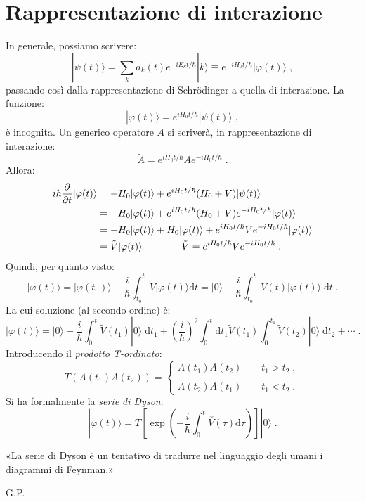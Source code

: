 \documentclass[12pt,a4paper]{report}
\theoremstyle{definition}
\numberwithin{equation}{section}
\newcommand{\diff}[1][]{\mathrm{d}#1}
\newcommand{\ket}{\rangle}
\newcommand{\Sch}{Schrödinger}
\begin{document}
\section{Rappresentazione di interazione}
In generale, possiamo scrivere:
\begin{equation}
|\psi(t)\ket=\sum_k a_k(t)e^{-iE_kt/\hbar}|k\ket\equiv e^{-iH_0t/\hbar}|\varphi(t)\ket\;,
\end{equation}
passando così dalla rappresentazione di \Sch\; a quella di interazione. La funzione:
\begin{equation}
|\varphi(t)\ket=e^{iH_0t/\hbar}|\psi(t)\ket\;,
\end{equation}
è incognita. Un generico operatore $A$ si scriverà, in rappresentazione di interazione:
\begin{equation}
\tilde{A}=e^{iH_0t/\hbar}Ae^{-iH_0t/\hbar}\;.
\end{equation}
Allora:
\begin{align}
i\hbar\frac{\partial}{\partial t}|\varphi(t)\ket &= -H_0|\varphi(t)\ket+e^{iH_0t/\hbar}(H_0+V)|\psi(t)\ket \notag \\
&= -H_0|\varphi(t)\ket+e^{iH_0t/\hbar}(H_0+V)e^{-iH_0t/\hbar}|\varphi(t)\ket \notag \\
&= -H_0|\varphi(t)\ket+H_0|\varphi(t)\ket+e^{iH_0t/\hbar}Ve^{-iH_0t/\hbar}|\varphi(t)\ket \notag \\
&= \tilde{V}|\varphi(t)\ket \qquad\qquad \tilde{V}=e^{iH_0t/\hbar}Ve^{-iH_0t/\hbar}\;.
\end{align}
Quindi, per quanto visto:
\begin{equation}
|\varphi(t)\ket=|\varphi(t_0)\ket-\frac{i}{\hbar}\int_{t_0}^t\tilde{V}|\varphi(t)\ket\diff{t}=|0\ket-\frac{i}{\hbar}\int_{t_0}^t\tilde{V}(t)|\varphi(t)\ket\;\diff{t}\;.
\end{equation}
La cui soluzione (al secondo ordine) è:
\begin{equation}
|\varphi(t)\ket=|0\ket-\frac{i}{\hbar}\int_0^t\tilde{V}(t_1)|0\ket\;\diff{t}_1+\left(\frac{i}{\hbar}\right)^2\int_0^t\diff{t}_1\tilde{V}(t_1)\int_0^{t_1}\tilde{V}(t_2)|0\ket\;\diff{t}_2+\cdots\;.
\end{equation}
Introducendo il \textit{prodotto T-ordinato}:
\begin{equation}
T\left(A(t_1)A(t_2)\right)=\begin{cases}
A(t_1)A(t_2) \qquad t_1>t_2\;, \\
\\
A(t_2)A(t_1) \qquad t_1<t_2\;.
\end{cases}
\end{equation}
Si ha formalmente la \textit{serie di Dyson}:
\begin{equation}
|\varphi(t)\ket=T\left[\exp\left(-\frac{i}{\hbar}\int_0^t\stackrel{\sim}{V}(\tau)\diff{\tau}\right)\right]|0\ket\;.
\end{equation}
\begin{quoting}
«La serie di Dyson è un tentativo di tradurre nel linguaggio degli umani i diagrammi di Feynman.»
\end{quoting}
\begin{flushright}
G.P.
\end{flushright}
\end{document}
